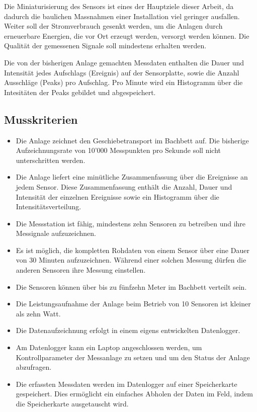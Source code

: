 Die Miniaturisierung des Sensors ist eines der Hauptziele dieser Arbeit, da dadurch die baulichen Massnahmen einer Installation viel geringer ausfallen. Weiter soll der Stromverbrauch gesenkt werden, um die Anlagen durch erneuerbare Energien, die vor Ort erzeugt werden, versorgt werden können. Die Qualität der gemessenen Signale soll mindestens erhalten werden.

Die von der bisherigen Anlage gemachten Messdaten enthalten die Dauer und Intensität jedes Aufschlags (Ereignis) auf der Sensorplatte, sowie die Anzahl Ausschläge (Peaks) pro Aufschlag. Pro Minute wird ein Histogramm über die Intesitäten der Peaks gebildet und abgespeichert.

\subsection{Musskriterien}
\begin{itemize}
\item Die Anlage zeichnet den Geschiebetransport im Bachbett auf. Die bisherige Aufzeichnungsrate von 10'000 Messpunkten pro Sekunde soll nicht unterschritten werden.
\item Die Anlage liefert eine minütliche Zusammenfassung über die Ereignisse an jedem Sensor. Diese Zusammenfassung enthält die Anzahl, Dauer und Intensität der einzelnen Ereignisse sowie ein Histogramm über die Intensitätsverteilung.
\item Die Messstation ist fähig, mindestens zehn Sensoren zu betreiben und ihre Messignale aufzuzeichnen.
\item Es ist möglich, die kompletten Rohdaten von einem Sensor über eine Dauer von 30 Minuten aufzuzeichnen. Während einer solchen Messung dürfen die anderen Sensoren ihre Messung einstellen.
\item Die Sensoren können über bis zu fünfzehn Meter im Bachbett verteilt sein.
\item Die Leistungsaufnahme der Anlage beim Betrieb von 10 Sensoren ist kleiner als zehn Watt.
\item Die Datenaufzeichnung erfolgt in einem eigens entwickelten Datenlogger.
\item Am Datenlogger kann ein Laptop angeschlossen werden, um Kontrollparameter der Messanlage zu setzen und um den Status der Anlage abzufragen.
\item Die erfassten Messdaten werden im Datenlogger auf einer Speicherkarte gespeichert. Dies ermöglicht ein einfaches Abholen der Daten im Feld, indem die Speicherkarte ausgetauscht wird.
\end{itemize}
